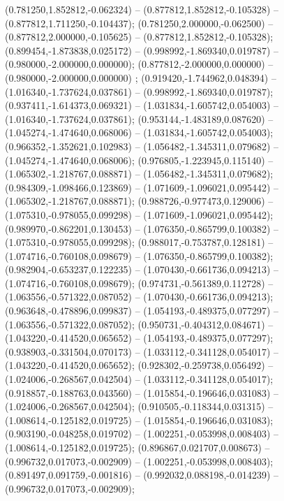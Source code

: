  (0.781250,1.852812,-0.062324) -- (0.877812,1.852812,-0.105328) -- (0.877812,1.711250,-0.104437);
 (0.781250,2.000000,-0.062500) -- (0.877812,2.000000,-0.105625) -- (0.877812,1.852812,-0.105328);
 (0.899454,-1.873838,0.025172) -- (0.998992,-1.869340,0.019787) -- (0.980000,-2.000000,0.000000);
 (0.877812,-2.000000,0.000000) -- (0.980000,-2.000000,0.000000) ;
 (0.919420,-1.744962,0.048394) -- (1.016340,-1.737624,0.037861) -- (0.998992,-1.869340,0.019787);
 (0.937411,-1.614373,0.069321) -- (1.031834,-1.605742,0.054003) -- (1.016340,-1.737624,0.037861);
 (0.953144,-1.483189,0.087620) -- (1.045274,-1.474640,0.068006) -- (1.031834,-1.605742,0.054003);
 (0.966352,-1.352621,0.102983) -- (1.056482,-1.345311,0.079682) -- (1.045274,-1.474640,0.068006);
 (0.976805,-1.223945,0.115140) -- (1.065302,-1.218767,0.088871) -- (1.056482,-1.345311,0.079682);
 (0.984309,-1.098466,0.123869) -- (1.071609,-1.096021,0.095442) -- (1.065302,-1.218767,0.088871);
 (0.988726,-0.977473,0.129006) -- (1.075310,-0.978055,0.099298) -- (1.071609,-1.096021,0.095442);
 (0.989970,-0.862201,0.130453) -- (1.076350,-0.865799,0.100382) -- (1.075310,-0.978055,0.099298);
 (0.988017,-0.753787,0.128181) -- (1.074716,-0.760108,0.098679) -- (1.076350,-0.865799,0.100382);
 (0.982904,-0.653237,0.122235) -- (1.070430,-0.661736,0.094213) -- (1.074716,-0.760108,0.098679);
 (0.974731,-0.561389,0.112728) -- (1.063556,-0.571322,0.087052) -- (1.070430,-0.661736,0.094213);
 (0.963648,-0.478896,0.099837) -- (1.054193,-0.489375,0.077297) -- (1.063556,-0.571322,0.087052);
 (0.950731,-0.404312,0.084671) -- (1.043220,-0.414520,0.065652) -- (1.054193,-0.489375,0.077297);
 (0.938903,-0.331504,0.070173) -- (1.033112,-0.341128,0.054017) -- (1.043220,-0.414520,0.065652);
 (0.928302,-0.259738,0.056492) -- (1.024006,-0.268567,0.042504) -- (1.033112,-0.341128,0.054017);
 (0.918857,-0.188763,0.043560) -- (1.015854,-0.196646,0.031083) -- (1.024006,-0.268567,0.042504);
 (0.910505,-0.118344,0.031315) -- (1.008614,-0.125182,0.019725) -- (1.015854,-0.196646,0.031083);
 (0.903190,-0.048258,0.019702) -- (1.002251,-0.053998,0.008403) -- (1.008614,-0.125182,0.019725);
 (0.896867,0.021707,0.008673) -- (0.996732,0.017073,-0.002909) -- (1.002251,-0.053998,0.008403);
 (0.891497,0.091759,-0.001816) -- (0.992032,0.088198,-0.014239) -- (0.996732,0.017073,-0.002909);
